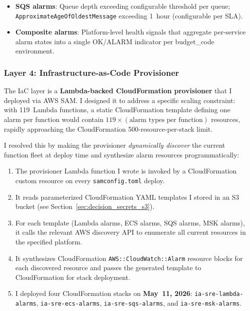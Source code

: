 \begin{itemize}
    \item \textbf{SQS alarms}: Queue depth exceeding configurable
          threshold per queue; \texttt{ApproximateAgeOfOldestMessage}
          exceeding 1~hour (configurable per SLA).

    \item \textbf{Composite alarms}: Platform-level health signals that
          aggregate per-service alarm states into a single
          OK/ALARM indicator per budget\_code environment.
\end{itemize}

\subsubsection{Layer 4: Infrastructure-as-Code Provisioner}

The IaC layer is a \textbf{Lambda-backed CloudFormation provisioner}
that I deployed via AWS SAM. I designed it to address a specific scaling
constraint: with 119~Lambda functions, a static CloudFormation template
defining one alarm per function would contain $119 \times (\text{alarm
types per function})$ resources, rapidly approaching the CloudFormation
500-resource-per-stack limit.

I resolved this by making the provisioner \emph{dynamically discover} the
current function fleet at deploy time and synthesize alarm resources
programmatically:

\begin{enumerate}
    \item The provisioner Lambda function I wrote is invoked by a CloudFormation
          custom resource on every \texttt{samconfig.toml} deploy.

    \item It reads parameterized CloudFormation YAML templates I stored in an
          S3 bucket (see Section~\ref{sec:decision_secrets_s3}).

    \item For each template (Lambda alarms, ECS alarms, SQS alarms, MSK
          alarms), it calls the relevant AWS discovery API to enumerate
          all current resources in the specified platform.

    \item It synthesizes CloudFormation \texttt{AWS::CloudWatch::Alarm}
          resource blocks for each discovered resource and passes the
          generated template to CloudFormation for stack deployment.

    \item I deployed four CloudFormation stacks on
          \textbf{May~11, 2026}: \texttt{ia-sre-lambda-alarms},
          \texttt{ia-sre-ecs-alarms}, \texttt{ia-sre-sqs-alarms}, and
          \texttt{ia-sre-msk-alarms}.
\end{enumerate}

